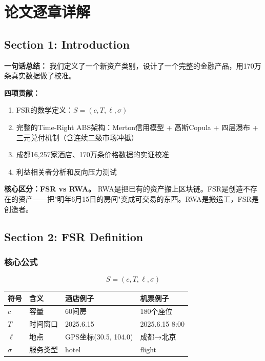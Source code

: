 \documentclass[12pt,a4paper]{ctexart}
\begin{document}
\newpage

\section{论文逐章详解}

\subsection{Section 1: Introduction}

\textbf{一句话总结：} 我们定义了一个新资产类别，设计了一个完整的金融产品，用170万条真实数据做了校准。

\textbf{四项贡献：}
\begin{enumerate}[nosep]
    \item FSR的数学定义：$S = (c, T, \ell, \sigma)$
    \item 完整的Time-Right ABS架构：Merton信用模型 + 高斯Copula + 四层瀑布 + 三元兑付机制（含连续二级市场冲抵）
    \item 成都16,257家酒店、170万条价格数据的实证校准
    \item 利益相关者分析和反向压力测试
\end{enumerate}

\textbf{核心区分：FSR vs RWA。} RWA是把已有的资产搬上区块链。FSR是创造不存在的资产——把"明年6月15日的房间"变成可交易的东西。RWA是搬运工，FSR是创造者。

\subsection{Section 2: FSR Definition}

\subsubsection{核心公式}
\begin{equation}
    S = (c, T, \ell, \sigma)
\end{equation}

\begin{center}
\begin{tabular}{@{}llll@{}}
\toprule
\textbf{符号} & \textbf{含义} & \textbf{酒店例子} & \textbf{机票例子} \\
\midrule
$c$ & 容量 & 60间房 & 180个座位 \\
$T$ & 时间窗口 & 2025.6.15 & 2025.6.15 8:00 \\
$\ell$ & 地点 & GPS坐标(30.5, 104.0) & 成都→北京 \\
$\sigma$ & 服务类型 & hotel & flight \\
\bottomrule
\end{tabular}
\end{center}
\end{document}
